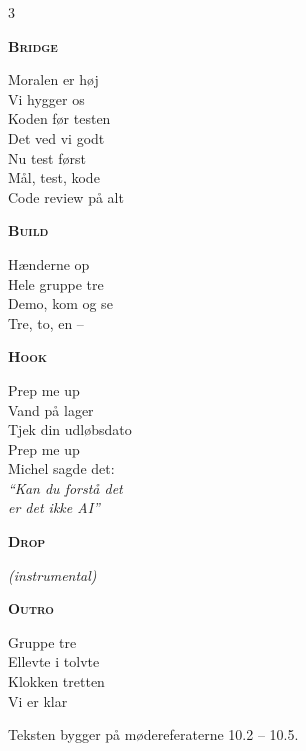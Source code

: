 \documentclass[a4paper,11pt]{article}
\newenvironment{songpart}[1]
    {\par\bigskip\noindent\begin{minipage}{\linewidth}\raggedright\textbf{\textsc{#1}}\par\smallskip}
    {\par\end{minipage}}
\newcommand{\hook}{%
\begin{songpart}{Build}
Hænderne op\\
Hele gruppe tre\\
Demo, kom og se\\
Tre, to, en --
\end{songpart}
\begin{songpart}{Hook}
Prep me up\\
Vand på lager\\
Tjek din udløbsdato\\
Prep me up\\
Michel sagde det:\\
\emph{\enquote{Kan du forstå det\\
er det ikke AI}}
\end{songpart}}
\newcommand{\drop}{%
\begin{songpart}{Drop}
\emph{(instrumental)}
\end{songpart}}
\begin{document}
\begin{multicols}{3}
\begin{songpart}{Bridge}
Moralen er høj\\
Vi hygger os\\
Koden før testen\\
Det ved vi godt\\
Nu test først\\
Mål, test, kode\\
Code review på alt
\end{songpart}

\hook

\drop

\begin{songpart}{Outro}
Gruppe tre\\
Ellevte i tolvte\\
Klokken tretten\\
Vi er klar
\end{songpart}

\end{multicols}

\vfill

\begin{center}
    \small Teksten bygger på mødereferaterne 10.2 -- 10.5.
\end{center}
\end{document}
